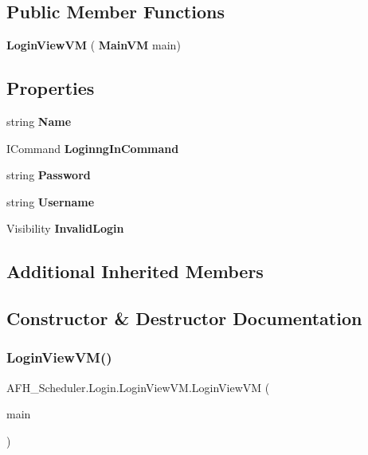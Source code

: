 \subsection*{Public Member Functions}
\begin{DoxyCompactItemize}
\item 
\textbf{ Login\+View\+VM} (\textbf{ Main\+VM} main)
\end{DoxyCompactItemize}
\subsection*{Properties}
\begin{DoxyCompactItemize}
\item 
string \textbf{ Name}\hspace{0.3cm}{\ttfamily  [get]}
\item 
I\+Command \textbf{ Loginng\+In\+Command}\hspace{0.3cm}{\ttfamily  [get]}
\item 
string \textbf{ Password}\hspace{0.3cm}{\ttfamily  [get, set]}
\item 
string \textbf{ Username}\hspace{0.3cm}{\ttfamily  [get, set]}
\item 
Visibility \textbf{ Invalid\+Login}\hspace{0.3cm}{\ttfamily  [get, set]}
\end{DoxyCompactItemize}
\subsection*{Additional Inherited Members}


\subsection{Constructor \& Destructor Documentation}
\mbox{\label{class_a_f_h___scheduler_1_1_login_1_1_login_view_v_m_ae3a79ae500524c59a4d2ba362b2b109a}} 
\subsubsection{LoginViewVM()}
{\footnotesize\ttfamily A\+F\+H\+\_\+\+Scheduler.\+Login.\+Login\+View\+V\+M.\+Login\+View\+VM (\begin{DoxyParamCaption}\item[{\textbf{ Main\+VM}}]{main }\end{DoxyParamCaption})}



